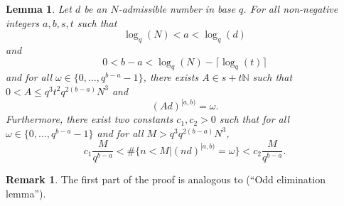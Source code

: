 \documentclass[12pt]{amsart}
\renewcommand{\leq}{\leqslant}
\newtheorem{lemma}[theorem]{Lemma}
\theoremstyle{definition}
\newtheorem{remark}[theorem]{Remark}
\numberwithin{equation}{section}
\newcommand\NN{\mathbb{N}}
\numberwithin{equation}{section}
\begin{document}
\begin{lemma}\label{odd-elimination}
	Let $d$ be an $N$-admissible number in base $q$. For all non-negative integers $a,b,s,t$ such that
	\[
		\log_q(N) <a<\log_{q}(d)
	\]
	and
	\[
		0< b-a < \log_q(N) - \lceil\log_{q}(t)\rceil
	\]
	and for all $\omega\in\{0,\dots,q^{b-a}-1\}$, there exists $A\in s + t\NN$ such that $0<A\leq q^3t^2q^{2(b-a)}N^3$ and
	\[
		(Ad)^{[a,b)}=\omega.
	\]
	Furthermore, there exist two constants $c_1, c_2>0$ such that for all $\omega\in\{0,\dots,q^{b-a}-1\}$ and for all $M>q^3q^{2(b-a)}N^3$,
	\begin{equation}
		c_1\frac{M}{q^{b-a}}<\#\{n<M|(nd)^{[a,b)}=\omega\}<c_2\frac{M}{q^{b-a}}.
	\end{equation}
\end{lemma}
\begin{remark}
	The first part of the proof is analogous to \cite[Corollary 4.1]{DrmotaSpiegelhofer2025} (``Odd elimination lemma'').
\end{remark}
\end{document}

